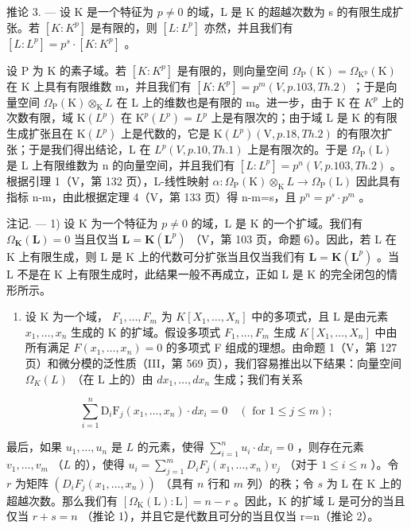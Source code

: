 推论 3. --- 设 K 是一个特征为 \(p \neq 0\) 的域，L 是 K 的超越次数为 s 的有限生成扩张。若 \([K:K^{p}]\) 是有限的，则 \([L:L^{p}]\) 亦然，并且我们有 \([L:L^{p}] = p^{s} \cdot [K:K^{p}]\) 。

设 P 为 K 的素子域。若 \([K:K^{p}]\) 是有限的，则向量空间 \(\Omega_{\mathrm{P}}(\mathrm{K})=\Omega_{\mathrm{K}^{\mathrm{p}}}\left(\mathrm{K}\right)\) 在 K 上具有有限维数 m，并且我们有 \([K:K^{p}]=p^{m}(V,p.103,Th.2)\) ；于是向量空间 \(\Omega_{\mathrm{P}}(\mathrm{K})\otimes_{\mathrm{K}}L\) 在 L 上的维数也是有限的 m。进一步，由于 K 在 \(K^{p}\) 上的次数有限，域 \(\mathrm{K}(L^{p})\) 在 \(\mathrm{K}^{p}(L^{p})=L^{p}\) 上是有限次的；由于域 L 是 K 的有限生成扩张且在 \(\mathrm{K}(L^{p})\) 上是代数的，它是 \(\mathrm{K}(L^{p})(\mathrm{V},p.18,Th.2)\) 的有限次扩张；于是我们得出结论，L 在 \(L^{p}(V,p.10,Th.1)\) 上是有限次的。于是 \(\Omega_{\mathrm{P}}(\mathrm{L})\) 是 L 上有限维数为 n 的向量空间，并且我们有 \([L:L^{p}]=p^{n}(V,p.103,Th.2)\) 。根据引理 1（V，第 132 页），L-线性映射 \(\alpha:\Omega_{\mathrm{P}}(\mathrm{K})\otimes_{\mathrm{K}}L\to\Omega_{\mathrm{P}}(\mathrm{L})\) 因此具有指标 n-m，由此根据定理 4（V，第 133 页）得 n-m=s，且 \(p^{n}=p^{s}\cdot p^{m}\) 。

注记. --- 1) 设 K 为一个特征为 \(p \neq 0\) 的域，L 是 K 的一个扩域。我们有 \(\Omega_{\mathbf{K}}(\mathbf{L}) = 0\) 当且仅当 \(\mathbf{L} = \mathbf{K}(\mathbf{L}^p)\) （V，第 103 页，命题 6）。因此，若 L 在 K 上有限生成，则 L 是 K 上的代数可分扩张当且仅当我们有 \(\mathbf{L} = \mathbf{K}(\mathbf{L}^p)\) 。当 L 不是在 K 上有限生成时，此结果一般不再成立，正如 L 是 K 的完全闭包的情形所示。

\begin{enumerate}
\def\labelenumi{\arabic{enumi})}
\setcounter{enumi}{1}
\tightlist
\item
  设 K 为一个域， \(F_{1}, \ldots, F_{m}\) 为 \(K[X_{1}, \ldots, X_{n}]\) 中的多项式，且 L 是由元素 \(x_{1}, \ldots, x_{n}\) 生成的 K 的扩域。假设多项式 \(F_{1}, \ldots, F_{m}\) 生成 \(K[X_{1}, \ldots, X_{n}]\) 中由所有满足 \(F(x_{1}, \ldots, x_{n}) = 0\) 的多项式 F 组成的理想。由命题 1（V，第 127 页）和微分模的泛性质（III，第 569 页），我们容易推出以下结果：向量空间 \(\Omega_{K}(L)\) （在 L 上的）由 \(dx_{1}, \ldots, dx_{n}\) 生成；我们有关系
\end{enumerate}

\[
\sum_ {i = 1} ^ {n} \mathrm{D} _ {i} \mathrm{F} _ {j} (x _ {1}, \dots , x _ {n}) \cdot d x _ {i} = 0 \quad (\text { for } 1 \leqslant j \leqslant m);\tag{6}
\]

最后，如果 \(u_1, \ldots, u_n\) 是 \(L\) 的元素，使得 \(\sum_{i=1}^{n} u_i \cdot dx_i = 0\) ，则存在元素 \(v_1, \ldots, v_m\) （\(L\) 的），使得 \(u_i = \sum_{j=1}^{m} D_i F_j(x_1, \ldots, x_n) v_j\) （对于 \(1 \leqslant i \leqslant n\) ）。令 \(r\) 为矩阵 \((D_i F_j(x_1, \ldots, x_n))\) （具有 \(n\) 行和 \(m\) 列）的秩；令 \(s\) 为 L 在 K 上的超越次数。那么我们有 \([\Omega_{\mathrm{K}}(\mathrm{L}):\mathrm{L}]=n-r\) 。因此，K 的扩域 L 是可分的当且仅当 \(r+s=n\) （推论 1），并且它是代数且可分的当且仅当 r=n（推论 2）。

